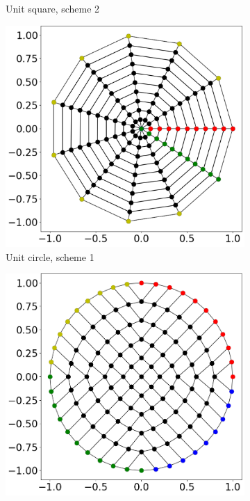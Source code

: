 \begin{figure}
\begin{subfigure}[t]{0.48\textwidth}
    \caption{Unit square, scheme 2}%
    \label{fig:quad_2}%
  \end{subfigure}
  \begin{subfigure}[t]{0.48\textwidth}%
    \centering%
    \includegraphics[width=\textwidth]{images/fiber_creation/quad_0.png}%
    \caption{Unit circle, scheme 1}%
    \label{fig:quad_0}%
  \end{subfigure}
  \quad
  \begin{subfigure}[t]{0.48\textwidth}%
    \centering%
    \includegraphics[width=\textwidth]{images/fiber_creation/quad_3.png}%

\end{subfigure}
\end{figure}
